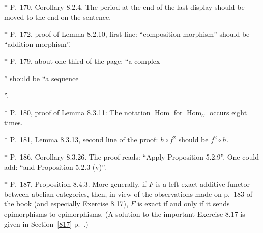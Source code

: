 \documentclass[12pt]{article}
\theoremstyle{remark}
\theoremstyle{definition}
\newcommand{\C}{\mathcal C}
\DeclareMathOperator{\Hom}{Hom}%
\begin{document}

\noindent $*$ P.~170, Corollary 8.2.4. The period at the end of the last display should be moved to the end on the sentence.


\noindent $*$ P.~172, proof of Lemma 8.2.10, first line: ``composition morphism'' should be ``addition morphism''.


\noindent $*$ P.~179, about one third of the page: ``a complex 
'' 
should be ``a sequence 
''.

\noindent $*$ P.~180, proof of Lemma 8.3.11: The notation $\Hom$ for $\Hom_\C$ occurs eight times.

\noindent $*$ P.~181, Lemma 8.3.13, second line of the proof: $h\circ f^2$ should be $f^2\circ h$.

\noindent $*$ P.~186, Corollary 8.3.26. The proof reads: ``Apply Proposition 5.2.9''. One could add: ``and Proposition 5.2.3 (v)''.

\noindent $*$ P.~187, Proposition 8.4.3. More generally, if $F$ is a left exact additive functor between abelian categories, then, in view of the observations made on p.~183 of the book (and especially Exercise 8.17), $F$ is exact if and only if it sends epimorphisms to epimorphisms. (A solution to the important Exercise 8.17 is given in Section~\ref{817} p.~\pageref{817}.)
\end{document}
